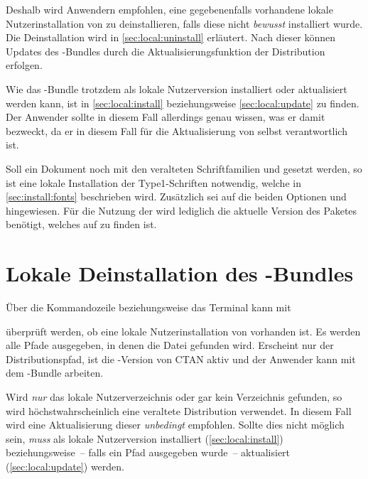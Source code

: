 Deshalb wird Anwendern empfohlen, eine gegebenenfalls vorhandene lokale 
Nutzerinstallation von \TUDScript zu deinstallieren, falls diese nicht 
\emph{bewusst} installiert wurde. Die Deinstallation wird in 
\autoref{sec:local:uninstall} erläutert. Nach dieser können Updates des 
\TUDScript-Bundles durch die Aktualisierungsfunktion der Distribution erfolgen. 

Wie das \TUDScript-Bundle trotzdem als lokale Nutzerversion installiert oder 
aktualisiert werden kann, ist in \autoref{sec:local:install} beziehungsweise 
\autoref{sec:local:update} zu finden. Der Anwender sollte in diesem Fall 
allerdings genau wissen, was er damit bezweckt, da er in diesem Fall für die 
Aktualisierung von \TUDScript selbst verantwortlich ist.

%
%
Soll ein Dokument noch mit den veralteten Schriftfamilien \Univers und \DIN 
gesetzt werden, so ist eine lokale Installation der Type1-Schriften notwendig, 
welche in \autoref{sec:install:fonts} beschrieben wird. Zusätzlich sei auf die 
beiden Optionen  und  hingewiesen. 
Für die Nutzung der \OpenSans wird lediglich die aktuelle Version des Paketes 
 benötigt, welches auf  zu finden ist.


\section{Lokale Deinstallation des \TUDScript-Bundles}
%
%
%
Über die Kommandozeile beziehungsweise das Terminal kann mit
%
\begin{quoting}
\end{quoting}
%
überprüft werden, ob eine lokale Nutzerinstallation von \TUDScript vorhanden 
ist. Es werden alle Pfade ausgegeben, in denen die Datei  
gefunden wird. Erscheint nur der Distributionspfad, ist die \TUDScript-Version 
von CTAN aktiv und der Anwender kann mit dem \TUDScript-Bundle arbeiten.

Wird \emph{nur} das lokale Nutzerverzeichnis oder gar kein Verzeichnis 
gefunden, so wird höchstwahrscheinlich eine veraltete Distribution 
verwendet. In diesem Fall wird eine Aktualisierung dieser \emph{unbedingt} 
empfohlen. Sollte dies nicht möglich sein, \emph{muss} \TUDScript als lokale 
Nutzerversion installiert (\autoref{sec:local:install}) beziehungsweise~-- 
falls ein Pfad ausgegeben wurde~-- aktualisiert (\autoref{sec:local:update}) 
werden.

